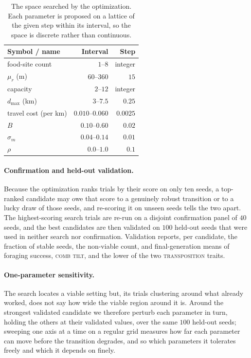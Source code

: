 \documentclass[11pt]{article}
\newcommand{\trait}[1]{\textsc{#1}}
\begin{document}
\begin{table}
  \centering
  \begin{tabular}{lrr}
    \toprule
    Symbol / name & Interval & Step \\
    \midrule
    food-site count & $1$--$8$ & integer \\
    $\mu_r$ (m)    & $60$--$360$ & $15$ \\
    capacity        & $2$--$12$ & integer \\
    $d_{\max}$ (km) & $3$--$7.5$ & $0.25$ \\
    travel cost (per km) & $0.010$--$0.060$ & $0.0025$ \\
    $B$        & $0.10$--$0.60$ & $0.02$ \\
    $\sigma_m$ & $0.04$--$0.14$ & $0.01$ \\
    $\rho$     & $0.0$--$1.0$   & $0.1$ \\
    \bottomrule
  \end{tabular}
  \caption{The space searched by the optimization. Each parameter is proposed on
    a lattice of the given step within its interval, so the space is discrete
    rather than continuous.}
  \label{tab:search-space}
\end{table}

\paragraph{Confirmation and held-out validation.}
Because the optimization ranks trials by their score on only ten seeds, a top-ranked
candidate may owe that score to a genuinely robust transition or to a lucky draw
of those seeds, and re-scoring it on unseen seeds tells the two
apart. The highest-scoring search trials are re-run on a disjoint confirmation panel of
$40$ seeds, and the best candidates are then validated on $100$
held-out seeds that were used in neither search nor confirmation. Validation reports, per
candidate, the fraction of stable seeds, the non-viable count, and
final-generation means of foraging success, \trait{comb tilt}, and the lower of
the two \trait{transposition} traits.

\paragraph{One-parameter sensitivity.}
The search locates a viable setting but, its trials clustering around what
already worked, does not say how wide the viable region around it is. Around the
strongest validated candidate we therefore perturb each parameter in turn,
holding the others at their validated values, over the same $100$ held-out seeds;
sweeping one axis at a time on a regular grid measures how far
each parameter can move before the transition degrades, and so which parameters
it tolerates freely and which it depends on finely.
\end{document}
